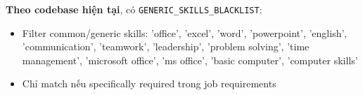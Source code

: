 \textbf{Theo codebase hiện tại}, có \texttt{GENERIC\_SKILLS\_BLACKLIST}:

\begin{itemize}
    \item Filter common/generic skills: 'office', 'excel', 'word', 'powerpoint', 'english', 'communication', 'teamwork', 'leadership', 'problem solving', 'time management', 'microsoft office', 'ms office', 'basic computer', 'computer skills'
    \item Chỉ match nếu specifically required trong job requirements
\end{itemize}


